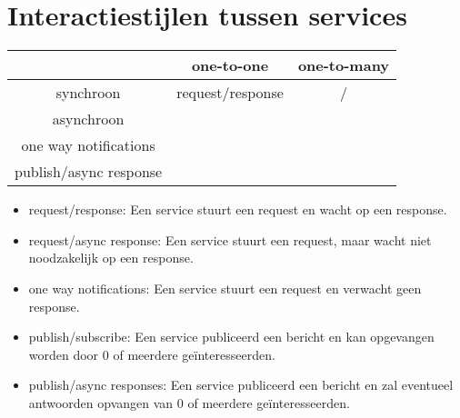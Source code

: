 \documentclass{report}
\begin{document}
	\chapter{Interactiestijlen tussen services}
	\begin{table}[ht]
		\centering
		\begin{tabular}{c | c | c}
			& one-to-one & one-to-many \\
			\hline
			synchroon & request/response & / \\
			\hline 
		asynchroon & \hspace{2em} \begin{minipage}[c]{0.3\textwidth}request/async response \\ one way notifications\end{minipage} & \hspace{2em} \begin{minipage}[c]{0.3\textwidth}publish/subscribe \\ publish/async response\end{minipage}
		\end{tabular}
	\end{table}
	\begin{itemize}
		\item[\info] request/response: Een service stuurt een request en wacht op een response.
		\item[\info] request/async response: Een service stuurt een request, maar wacht niet noodzakelijk op een response.
		\item[\info] one way notifications: Een service stuurt een request en verwacht geen response.
		\item[\info] publish/subscribe: Een service publiceerd een bericht en kan opgevangen worden door 0 of meerdere geïnteresseerden.
		\item[\info] publish/async responses: Een service publiceerd een bericht en zal eventueel antwoorden opvangen van 0 of meerdere geïnteresseerden.
	\end{itemize}
\end{document}
